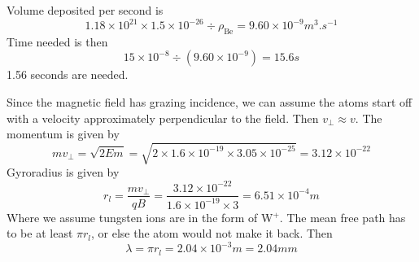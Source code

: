\documentclass[answers]{exam}
\begin{document}
\begin{questions}
\begin{parts}
\begin{solution}
    Volume deposited per second is
    $$1.18 \times 10^{21} \times 1.5 \times 10^{-26} \div \rho_{\text{Be}} = 9.60 \times 10^{-9} \unit{m^3.s^{-1}}$$
    Time needed is then
    $$15 \times 10^{-8} \div (9.60 \times 10^{-9}) = 15.6 \unit{s}$$
    1.56 seconds are needed.
\end{solution}

\end{parts}



\begin{solution}
    Since the magnetic field has grazing incidence, we can assume the atoms start off with a velocity approximately perpendicular to the field. Then $v_\perp \approx v$. The momentum is given by
    $$mv_\perp = \sqrt{2Em} = \sqrt{2\times1.6\times10^{-19}\times3.05\times10^{-25}} = 3.12 \times 10^{-22}$$
    Gyroradius is given by
    $$r_l = \frac{mv_\perp}{qB} = \frac{3.12\times10^{-22}}{1.6\times10^{-19}\times3} = 6.51 \times 10^{-4}\unit{m}$$
    Where we assume tungsten ions are in the form of W$^+$. The mean free path has to be at least $\pi r_l$, or else the atom would not make it back. Then
    $$\lambda = \pi r_l = 2.04 \times 10^{-3}\unit{m} = 2.04 \unit{mm}$$
\end{solution}




\end{questions}
\end{document}
